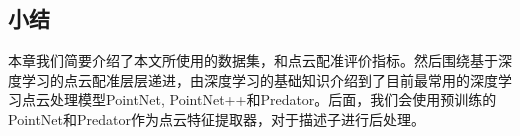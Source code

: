 \subsection{小结}
本章我们简要介绍了本文所使用的数据集，和点云配准评价指标。然后围绕基于深度学习的点云配准层层递进，由深度学习的基础知识介绍到了目前最常用的深度学习点云处理模型PointNet, PointNet++和Predator。后面，我们会使用预训练的PointNet和Predator作为点云特征提取器，对于描述子进行后处理。